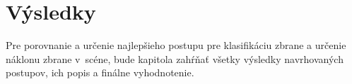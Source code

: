 
\chapter{Výsledky}
Pre porovnanie a určenie najlepšieho postupu pre klasifikáciu zbrane a určenie náklonu zbrane v~scéne,
    bude kapitola zahŕňať všetky výsledky navrhovaných postupov, ich popis a finálne vyhodnotenie.









